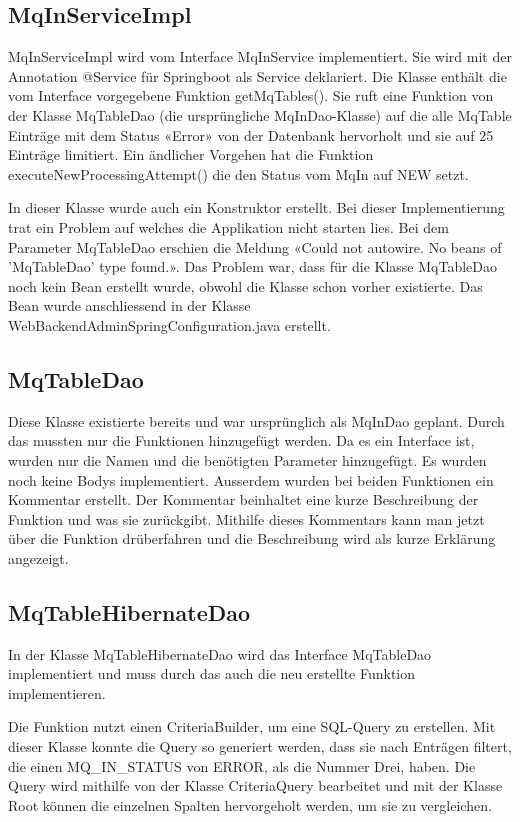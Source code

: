 \subsection{MqInServiceImpl}
MqInServiceImpl wird vom Interface MqInService implementiert. Sie wird mit der Annotation @Service für Springboot als Service deklariert. Die Klasse enthält die vom Interface vorgegebene Funktion getMqTables(). Sie ruft eine Funktion von der Klasse MqTableDao (die ursprüngliche MqInDao-Klasse) auf die alle MqTable Einträge mit dem Status «Error» von der Datenbank hervorholt und sie auf 25 Einträge limitiert. Ein ändlicher Vorgehen hat die Funktion executeNewProcessingAttempt() die den Status vom MqIn auf NEW setzt.  

In dieser Klasse wurde auch ein Konstruktor erstellt. Bei dieser Implementierung trat ein Problem auf welches die Applikation nicht starten lies. Bei dem Parameter MqTableDao erschien die Meldung «Could not autowire. No beans of 'MqTableDao' type found.». Das Problem war, dass für die Klasse MqTableDao noch kein Bean erstellt wurde, obwohl die Klasse schon vorher existierte. Das Bean wurde anschliessend in der Klasse WebBackendAdminSpringConfiguration.java erstellt.

\subsection{MqTableDao}
Diese Klasse existierte bereits und war ursprünglich als MqInDao geplant. Durch das mussten nur die Funktionen hinzugefügt werden. Da es ein Interface ist, wurden nur die Namen und die benötigten Parameter hinzugefügt. Es wurden noch keine Bodys implementiert. Ausserdem wurden bei beiden Funktionen ein Kommentar erstellt. Der Kommentar beinhaltet eine kurze Beschreibung der Funktion und was sie zurückgibt. Mithilfe dieses Kommentars kann man jetzt über die Funktion drüberfahren und die Beschreibung wird als kurze Erklärung angezeigt.

\subsection{MqTableHibernateDao}
In der Klasse MqTableHibernateDao wird das Interface MqTableDao implementiert und muss durch das auch die neu erstellte Funktion implementieren.

Die Funktion nutzt einen CriteriaBuilder, um eine SQL-Query zu erstellen. Mit dieser Klasse konnte die Query so generiert werden, dass sie nach Enträgen filtert, die einen MQ\_IN\_STATUS von ERROR, als die Nummer Drei, haben. Die Query wird mithilfe von der Klasse CriteriaQuery bearbeitet und mit der Klasse Root können die einzelnen Spalten hervorgeholt werden, um sie zu vergleichen.

